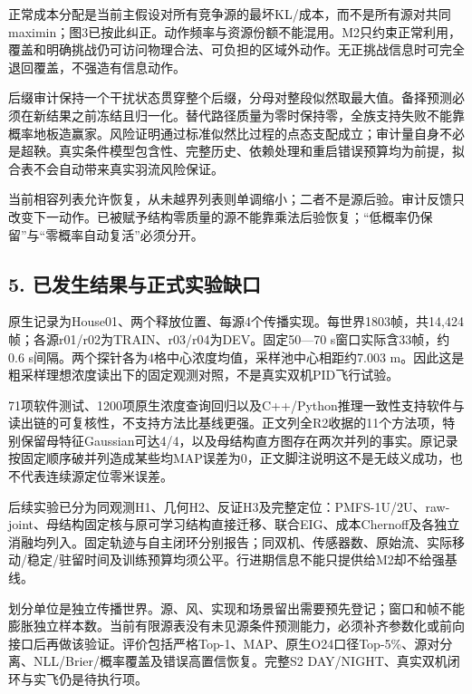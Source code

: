 正常成本分配是当前主假设对所有竞争源的最坏KL/成本，而不是所有源对共同maximin；图3已按此纠正。动作频率与资源份额不能混用。M2只约束正常利用，覆盖和明确挑战仍可访问物理合法、可负担的区域外动作。无正挑战信息时可完全退回覆盖，不强造有信息动作。

后缀审计保持一个干扰状态贯穿整个后缀，分母对整段似然取最大值。备择预测必须在新结果之前冻结且归一化。替代路径质量为零时保持零，全族支持失败不能靠概率地板造赢家。风险证明通过标准似然比过程的点态支配成立；审计量自身不必是超鞅。真实条件模型包含性、完整历史、依赖处理和重启错误预算均为前提，拟合表不会自动带来真实羽流风险保证。

当前相容列表允许恢复，从未越界列表则单调缩小；二者不是源后验。审计反馈只改变下一动作。已被赋予结构零质量的源不能靠乘法后验恢复；``低概率仍保留''与``零概率自动复活''必须分开。

\hypertarget{ux5df2ux53d1ux751fux7ed3ux679cux4e0eux6b63ux5f0fux5b9eux9a8cux7f3aux53e3}{%
\subsection{5.
已发生结果与正式实验缺口}\label{ux5df2ux53d1ux751fux7ed3ux679cux4e0eux6b63ux5f0fux5b9eux9a8cux7f3aux53e3}}

原生记录为House01、两个释放位置、每源4个传播实现。每世界1803帧，共14,424帧；各源r01/r02为TRAIN、r03/r04为DEV。固定50---70
s窗口实际含33帧，约0.6
s间隔。两个探针各为4格中心浓度均值，采样池中心相距约7.003
m。因此这是粗采样理想浓度读出下的固定观测对照，不是真实双机PID飞行试验。

71项软件测试、1200项原生浓度查询回归以及C++/Python推理一致性支持软件与读出链的可复核性，不支持方法比基线更强。正文列全R2收据的11个方法项，特别保留母特征Gaussian可达4/4，以及母结构直方图存在两次并列的事实。原记录按固定顺序破并列造成某些均MAP误差为0，正文脚注说明这不是无歧义成功，也不代表连续源定位零米误差。

后续实验已分为同观测H1、几何H2、反证H3及完整定位：PMFS-1U/2U、raw-joint、母结构固定核与原可学习结构直接迁移、联合EIG、成本Chernoff及各独立消融均列入。固定轨迹与自主闭环分别报告；同双机、传感器数、原始流、实际移动/稳定/驻留时间及训练预算均须公平。行进期信息不能只提供给M2却不给强基线。

划分单位是独立传播世界。源、风、实现和场景留出需要预先登记；窗口和帧不能膨胀独立样本数。当前有限源表没有未见源条件预测能力，必须补齐参数化或前向接口后再做该验证。评价包括严格Top-1、MAP、原生O24口径Top-5\%、源对分离、NLL/Brier/概率覆盖及错误高置信恢复。完整S2
DAY/NIGHT、真实双机闭环与实飞仍是待执行项。

